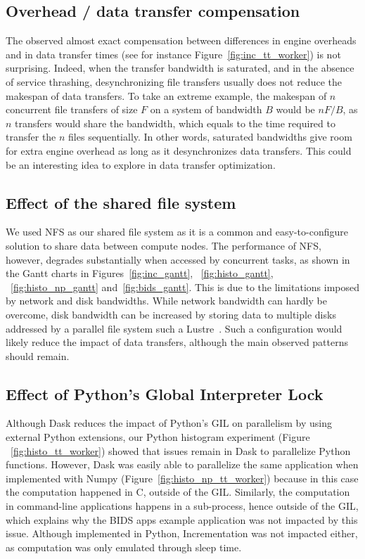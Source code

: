 \documentclass[conference]{IEEEtran}
\begin{document}
\subsection{Overhead / data transfer compensation}

The observed almost exact compensation between differences in engine
overheads and in data transfer times (see for instance
Figure~\ref{fig:inc_tt_worker}) is not surprising. Indeed, when the transfer
bandwidth is saturated, and in the absence of service thrashing,
desynchronizing file transfers usually does not reduce the makespan of data
transfers. To take an extreme example, the makespan of $n$ concurrent file
transfers of size $F$ on a system of bandwidth $B$ would be $nF/B$, as $n$
transfers would share the bandwidth, which equals to the time required
to transfer the $n$ files sequentially. In other words, saturated bandwidths
give room for extra engine overhead as long as it desynchronizes data
transfers. This could be an interesting idea to explore in data transfer optimization.

\subsection{Effect of the shared file system}

We used NFS as our shared file system as it is a common and
easy-to-configure solution to share data between compute nodes. The
performance of NFS, however, degrades substantially when accessed by
concurrent tasks, as shown in the Gantt charts in
Figures~\ref{fig:inc_gantt}, ~\ref{fig:histo_gantt}, ~\ref{fig:histo_np_gantt} 
and~\ref{fig:bids_gantt}. This is due to the limitations imposed by network and disk
bandwidths. While network bandwidth can hardly be overcome, disk bandwidth
can be increased by storing data to multiple disks addressed by a parallel
file system such a Lustre~\cite{lustre}. Such a configuration would likely
reduce the impact of data transfers, although the main observed patterns
should remain. 

\subsection{Effect of Python's Global Interpreter Lock}

Although Dask reduces the impact of Python's GIL on parallelism by using external
Python extensions, our Python histogram experiment (Figure
~\ref{fig:histo_tt_worker}) showed that issues remain in Dask to
parallelize Python functions. However, Dask was easily able to parallelize
the same application when implemented with Numpy
(Figure~\ref{fig:histo_np_tt_worker}) because in this case the computation
happened in C, outside of the GIL. Similarly, the computation in
command-line applications happens in a sub-process, hence outside of the
GIL, which explains why the BIDS apps example application was not impacted
by this issue. Although implemented in Python, Incrementation was not
impacted either, as computation was only emulated through sleep time.
\end{document}

